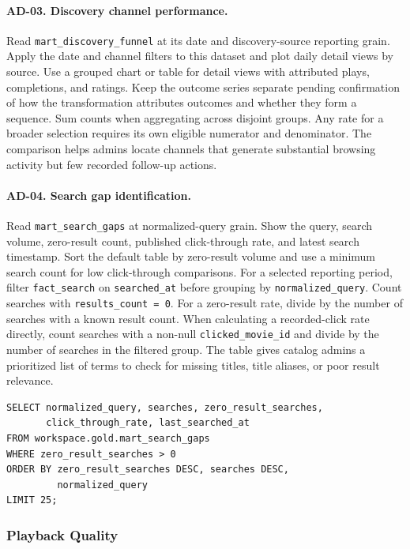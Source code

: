 \documentclass[a4paper,12pt]{article}
\newcommand{\dbsep}{\_\allowbreak}
\begin{document}
\paragraph{AD-03. Discovery channel performance.}
Read \texttt{mart\dbsep discovery\dbsep funnel} at its date and
discovery-source reporting grain. Apply the date and channel filters
to this dataset and plot daily detail views by source. Use a grouped
chart or table for detail views with attributed plays, completions,
and ratings. Keep the outcome series separate pending confirmation
of how the transformation attributes outcomes and whether they form
a sequence. Sum counts when aggregating across disjoint groups.
Any rate for a broader selection requires its own eligible numerator
and denominator. The comparison helps admins locate channels that
generate substantial browsing activity but few recorded follow-up
actions.

\paragraph{AD-04. Search gap identification.}
Read \texttt{mart\dbsep search\dbsep gaps} at normalized-query grain.
Show the query, search volume, zero-result count, published
click-through rate, and latest search timestamp. Sort the default
table by zero-result volume and use a minimum search count for
low click-through comparisons. For a selected reporting period,
filter \texttt{fact\dbsep search} on \texttt{searched\_at} before
grouping by \texttt{normalized\_query}. Count searches with
\texttt{results\_count = 0}. For a zero-result rate, divide by the
number of searches with a known result count. When calculating a
recorded-click rate directly, count searches with a non-null
\texttt{clicked\_movie\_id} and divide by the number of searches in
the filtered group. The table gives catalog admins a prioritized
list of terms to check for missing titles, title aliases, or poor
result relevance.

\begingroup
\small
\begin{verbatim}
SELECT normalized_query, searches, zero_result_searches,
       click_through_rate, last_searched_at
FROM workspace.gold.mart_search_gaps
WHERE zero_result_searches > 0
ORDER BY zero_result_searches DESC, searches DESC,
         normalized_query
LIMIT 25;
\end{verbatim}
\endgroup

\subsubsection{Playback Quality}
\end{document}
